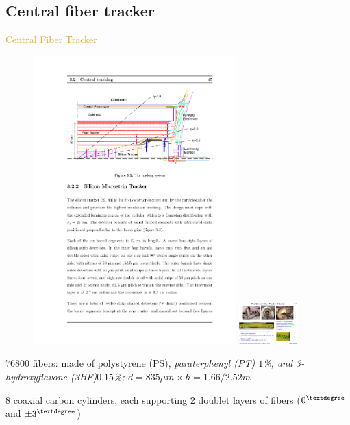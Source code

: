 \subsection{Central fiber tracker}
\begin{frame}{\textcolor{Goldenrod}{Central Fiber Tracker}}
  \begin{overlayarea}{\textwidth}{\textheight}
    \begin{figure}[h]\centering
      \includegraphics[height=0.4\textheight,width=0.7\textwidth]{./Images/08_CT_01.pdf}
      \includegraphics[height=0.1\textheight, width=0.2\textwidth]{./Images/15_CFT}
    \end{figure}
    \itt[<+->]  
    
    
    
  \item $76800$ fibers: made of polystyrene (PS), \it{paraterphenyl (PT) $1$\%, and
      3-hydroxyflavone (3HF)$0.15$\%}; $d = 835 \mu m \times h =1.66/2.52 m$
  \item 8 coaxial carbon cylinders, each supporting 2 doublet layers
    of fibers
    ($0^{\textdegree}$ and $\pm 3^{\textdegree}$)
    \tti
  \end{overlayarea}
\end{frame}

